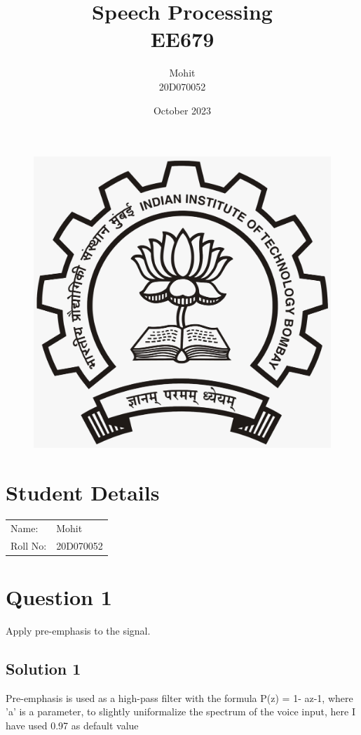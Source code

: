 \documentclass{article}
\title{Speech Processing\\EE679}
\author{Mohit\\20D070052 }
\date{October 2023}
\begin{document}
\maketitle
\begin{figure}[H]
\begin{center}
\includegraphics[scale = 0.2]{LOGO.jpeg}
\end{center}
\end{figure}
\section{Student Details}
\begin{tabular}{ l l  }
 Name: & Mohit \\ 
 Roll No: & 20D070052  \\  
\end{tabular}

\newpage

\section{Question 1}

Apply pre-emphasis to the signal.

\subsection{Solution 1}
Pre-emphasis is used as a high-pass filter with the formula P(z) = 1- az-1, where 'a' is a parameter, to slightly uniformalize the spectrum of the voice input, here I have used 0.97 as default value
\end{document}

